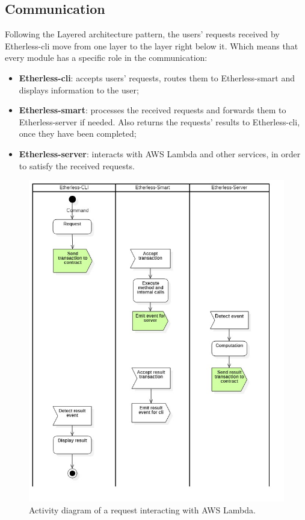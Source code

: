 	\subsection{Communication} %
	Following the Layered architecture pattern, the users' requests received by Etherless-cli move from one layer to the layer right below it. Which means that every module has a specific role in the communication:
	\begin{itemize}
		\item \textbf{Etherless-cli}: accepts users' requests, routes them to Etherless-smart and displays information to the user;
		\item \textbf{Etherless-smart}: processes the received requests and forwards them to Etherless-server if needed. Also returns the requests' results to Etherless-cli, once they have been completed;
		\item \textbf{Etherless-server}: interacts with AWS Lambda and other services, in order to satisfy the received requests.
	\end{itemize}
	\begin{figure}
		\centering
		\includegraphics[width=0.9\linewidth]{diagrammi/generali/activity_diag_pattern2}
		\caption{Activity diagram of a request interacting with AWS Lambda.}
	\end{figure}
